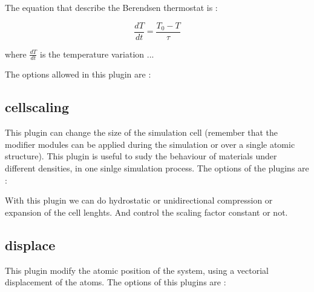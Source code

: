 The equation that describe the Berendsen thermostat is :

$$\frac{dT}{dt} = \frac{T_0 - T}{\tau}$$

\noindent
where $\frac{dT}{dt}$ is  the temperature variation ...

The options allowed in this plugin are :


\subsection{cellscaling}
This plugin can change the size of the simulation cell (remember that the
modifier modules can be applied during the simulation or over a single atomic
structure). This plugin is useful to sudy the behaviour of materials under
different densities, in one sinlge simulation process. The options of the
plugins are :


With this plugin we can do hydrostatic or unidirectional compression or
expansion of the cell lenghts. And control the scaling factor constant or not.

\subsection{displace}
This plugin modify the atomic position of the system, using a vectorial
displacement of the atoms. The options of this plugins are :



